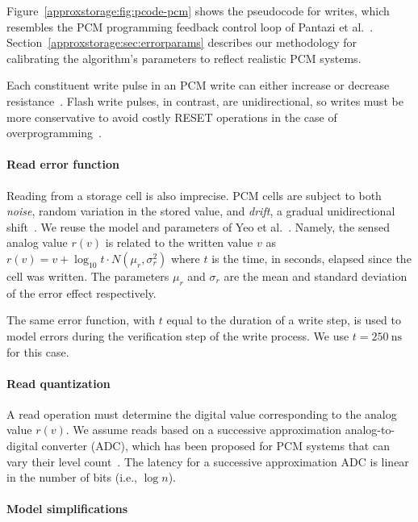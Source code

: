 Figure~\ref{approxstorage:fig:pcode-pcm} shows the pseudocode for
writes, which resembles the PCM programming feedback
control loop of Pantazi et al.~\cite{mlcmodelchar}.
Section~\ref{approxstorage:sec:errorparams} describes our methodology for
calibrating the algorithm's parameters to reflect realistic PCM
systems.

Each constituent write pulse in an PCM write can either increase or decrease
resistance~\cite{mlcprogalgo,mlcibm,mlcmodelchar}.
Flash write pulses, in contrast, are unidirectional, so writes
must be more conservative to avoid costly RESET operations
in the case of overprogramming~\cite{ispp}.

\paragraph{Read error function}

Reading from a storage cell is also imprecise. PCM
cells are subject to both \emph{noise}, random variation in the stored value,
and \emph{drift}, a gradual unidirectional
shift~\cite{mlcpcmreliability}. We reuse the model and parameters of
Yeo et al.~\cite{wdddmlcpcm}. Namely, the sensed
analog value $r(v)$ is related to the written value $v$ as
$r(v) = v + \log_{10} t \cdot N(\mu_r, \sigma_r^2)$
where $t$ is the time, in seconds, elapsed since the cell was written.
The parameters $\mu_r$ and $\sigma_r$ are the mean and standard
deviation of the error effect respectively.

The same error function, with $t$ equal to the duration of a write step,
is used to model errors during the verification step of the write
process. We use $t = 250~\mathrm{ns}$~\cite{writecancel,improvingwrites} for
this case.

\paragraph{Read quantization}

A read operation must determine the digital value corresponding to the
analog value $r(v)$. We assume reads based on a successive
approximation analog-to-digital converter (ADC), which has been proposed for PCM
systems that can vary their level count~\cite{morphablepcm}. The
latency for a successive approximation ADC is linear in the number of
bits (i.e., $\log n$).

\paragraph{Model simplifications}

